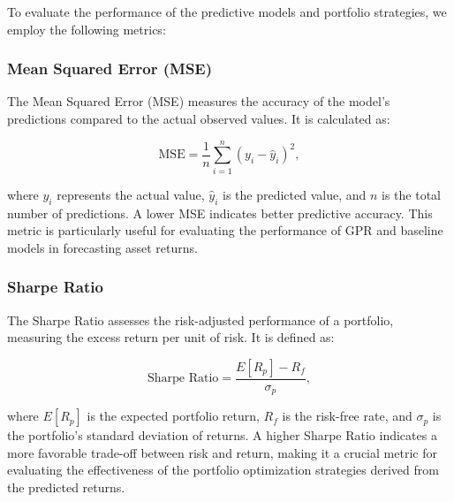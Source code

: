 To evaluate the performance of the predictive models and portfolio strategies, we employ the following metrics:

\subsubsection{Mean Squared Error (MSE)}

The Mean Squared Error (MSE) measures the accuracy of the model's predictions compared to the actual observed values. It is calculated as:

\begin{equation}
\text{MSE} = \frac{1}{n} \sum_{i=1}^{n} \left( y_i - \hat{y}_i \right)^2,
\end{equation}

where $y_i$ represents the actual value, $\hat{y}_i$ is the predicted value, and $n$ is the total number of predictions. A lower MSE indicates better predictive accuracy. This metric is particularly useful for evaluating the performance of GPR and baseline models in forecasting asset returns.

\subsubsection{Sharpe Ratio}

The Sharpe Ratio assesses the risk-adjusted performance of a portfolio, measuring the excess return per unit of risk. It is defined as:

\begin{equation}
\text{Sharpe Ratio} = \frac{E[R_p] - R_f}{\sigma_p},
\end{equation}

where $E[R_p]$ is the expected portfolio return, $R_f$ is the risk-free rate, and $\sigma_p$ is the portfolio's standard deviation of returns. A higher Sharpe Ratio indicates a more favorable trade-off between risk and return, making it a crucial metric for evaluating the effectiveness of the portfolio optimization strategies derived from the predicted returns.

